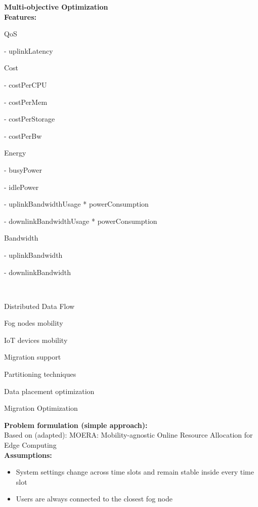 \documentclass{article}
\begin{document}
\newcommand{\SubItem}[1]{
    {\setlength\itemindent{15pt} \item[-] #1}
}

\noindent\textbf{Multi-objective Optimization}\\[12pt]

\noindent\textbf{Features:}\\[6pt]
\begin{itemize}
\item QoS
    \SubItem{uplinkLatency}
\item Cost
    \SubItem{costPerCPU}
    \SubItem{costPerMem}
    \SubItem{costPerStorage}
    \SubItem{costPerBw}
\item Energy
    \SubItem{busyPower}
    \SubItem{idlePower}
    \SubItem{uplinkBandwidthUsage * powerConsumption}
    \SubItem{downlinkBandwidthUsage * powerConsumption}
\item Bandwidth
    \SubItem{uplinkBandwidth}
    \SubItem{downlinkBandwidth}\\[12pt]
    
\item Distributed Data Flow
\item Fog nodes mobility
\item IoT devices mobility
\item Migration support
\item Partitioning techniques
\item Data placement optimization
\item Migration Optimization
\end{itemize}
\pagebreak

\noindent\textbf{Problem formulation (simple approach):}\\[6pt]
Based on (adapted): MOERA: Mobility-agnostic Online Resource Allocation for Edge Computing\\[12pt]
\noindent\textbf{Assumptions:}\\[6pt]
\begin{itemize}
    \item System settings change across time slots and remain stable inside every time slot
    \item Users are always connected to the closest fog node
\end{itemize}
\end{document}
